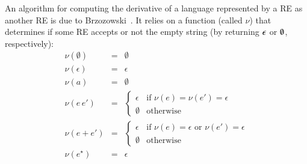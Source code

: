 \documentclass[review]{elsarticle}
\newcommand{\C}[1]{\red{\mathsf{#1}}}
\begin{document}
An algorithm for computing the derivative of a language represented by
a RE as another RE is due to Brzozowski~\cite{Brzozowski1964}. It
relies on a function (called $\nu$) that determines if some RE accepts
or not the empty string (by returning \ensuremath{\C{\epsilon}} or \ensuremath{\C{\emptyset}}, respectively):
\[
    \begin{array}{lcl}
         \nu(\emptyset) & = & \emptyset \\
         \nu(\epsilon)    & = & \epsilon \\
         \nu(a)                & = & \emptyset \\
         \nu(e\,e')           & = & \left\{
                                                 \begin{array}{ll}
                                                      \epsilon &
                                                                 \text{if
                                                                 }\nu(e)
                                                                 =
                                                                 \nu(e')
                                                                 =
                                                                 \epsilon
                                                   \\
                                                   \emptyset &
                                                               \text{otherwise}
                                                 \end{array}
                                             \right. \\
         \nu(e + e')  & = & \left\{
                                         \begin{array}{ll}
                                              \epsilon & \text{if
                                                         }\nu(e) =
                                                         \epsilon
                                                         \text{ or
                                                         }\nu(e') =
                                                         \epsilon \\
                                              \emptyset & \text{otherwise}
                                         \end{array}
                                      \right. \\
         \nu(e^\star) & = & \epsilon
    \end{array}
\]
\end{document}
